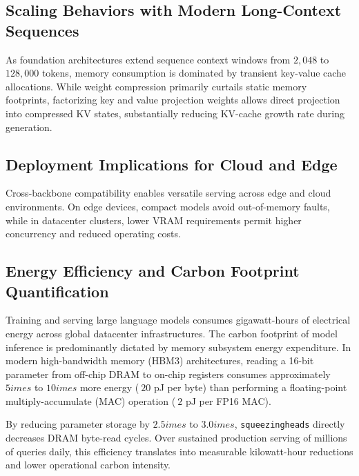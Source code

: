 \subsection{Scaling Behaviors with Modern Long-Context Sequences}
As foundation architectures extend sequence context windows from $2{,}048$ to $128{,}000$ tokens, memory consumption is dominated by transient key-value cache allocations. While weight compression primarily curtails static memory footprints, factorizing key and value projection weights allows direct projection into compressed KV states, substantially reducing KV-cache growth rate during generation.

\subsection{Deployment Implications for Cloud and Edge}
Cross-backbone compatibility enables versatile serving across edge and cloud environments. On edge devices, compact models avoid out-of-memory faults, while in datacenter clusters, lower VRAM requirements permit higher concurrency and reduced operating costs.

\subsection{Energy Efficiency and Carbon Footprint Quantification}
Training and serving large language models consumes gigawatt-hours of electrical energy across global datacenter infrastructures. The carbon footprint of model inference is predominantly dictated by memory subsystem energy expenditure. In modern high-bandwidth memory (HBM3) architectures, reading a 16-bit parameter from off-chip DRAM to on-chip registers consumes approximately $5	imes$ to $10	imes$ more energy ($~20$ pJ per byte) than performing a floating-point multiply-accumulate (MAC) operation ($~2$ pJ per FP16 MAC).

By reducing parameter storage by $2.5	imes$ to $3.0	imes$, \texttt{squeezingheads} directly decreases DRAM byte-read cycles. Over sustained production serving of millions of queries daily, this efficiency translates into measurable kilowatt-hour reductions and lower operational carbon intensity.
